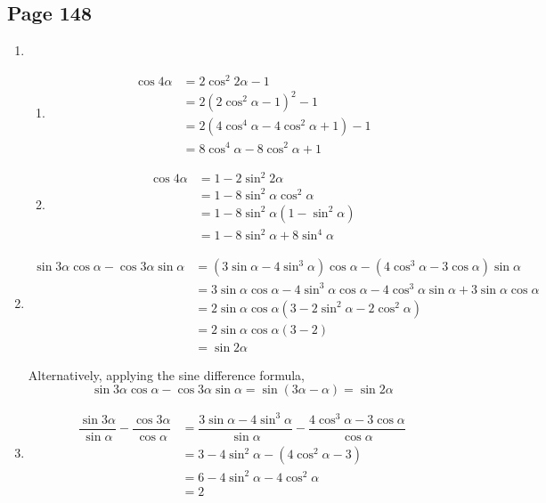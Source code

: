 \documentclass{article}
\newenvironment{solutions}[1]
{\subsection*{#1}
 \begin{enumerate}[leftmargin=1.5em]}
{\end{enumerate}}
\newcommand{\solution}{\item}
\newenvironment{subsolutions}
{\begin{enumerate}}
{\end{enumerate}}
\newcommand{\subsolution}{\item}
\begin{document}
\begin{solutions}{Page 148}
\solution %
\begin{subsolutions}
\subsolution %
\begin{align*}
\cos{4\alpha} &= 2\cos^{2}{2\alpha} - 1 \\
&= 2\left(2\cos^{2}{\alpha}-1\right)^2-1 \\
&= 2\left(4\cos^{4}{\alpha}-4\cos^{2}{\alpha}+1\right)-1 \\
&= 8\cos^{4}{\alpha} - 8\cos^{2}{\alpha} + 1
\end{align*}

\subsolution %
\begin{align*}
\cos{4\alpha} &= 1-2\sin^{2}{2\alpha} \\
&= 1-8\sin^{2}{\alpha}\cos^{2}{\alpha} \\
&= 1-8\sin^{2}{\alpha}\left(1-\sin^{2}{\alpha}\right) \\
&= 1-8\sin^{2}{\alpha}+8\sin^{4}{\alpha}
\end{align*}
\end{subsolutions}

\solution %
\begin{align*}
\sin{3\alpha}\cos{\alpha}-\cos{3\alpha}\sin{\alpha} &= \left(3\sin{\alpha}-4\sin^{3}{\alpha}\right)\cos{\alpha}-\left(4\cos^{3}{\alpha}-3\cos{\alpha}\right)\sin{\alpha} \\
&= 3\sin{\alpha}\cos{\alpha}-4\sin^{3}{\alpha}\cos{\alpha}-4\cos^{3}{\alpha}\sin{\alpha}+3\sin{\alpha}\cos{\alpha} \\
&= 2\sin{\alpha}\cos{\alpha}\left(3 - 2\sin^{2}{\alpha} - 2\cos^{2}{\alpha}\right) \\
&= 2\sin{\alpha}\cos{\alpha} \left(3-2\right) \\
&= \sin{2\alpha}
\end{align*}

Alternatively, applying the sine difference formula,
\[
\sin{3\alpha}\cos{\alpha}-\cos{3\alpha}\sin{\alpha} = \sin\left(3\alpha-\alpha\right) = \sin{2\alpha}
\]

\solution %
\begin{align*}
\dfrac{\sin{3\alpha}}{\sin{\alpha}} - \dfrac{\cos{3\alpha}}{\cos{\alpha}} &= \dfrac{3\sin{\alpha}-4\sin^{3}{\alpha}}{\sin{\alpha}} - \dfrac{4\cos^{3}{\alpha}-3\cos{\alpha}}{\cos{\alpha}}\\
&=3-4\sin^{2}{\alpha} - \left(4\cos^{2}{\alpha}-3\right) \\
&= 6-4\sin^{2}{\alpha}-4\cos^{2}{\alpha} \\
&= 2
\end{align*}


\end{solutions}
\end{document}
